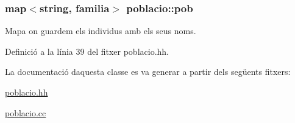 \subsubsection[{\texorpdfstring{pob}{pob}}]{\setlength{\rightskip}{0pt plus 5cm}map$<$string, {\bf familia}$>$ poblacio\+::pob\hspace{0.3cm}{\ttfamily [private]}}\hypertarget{classpoblacio_a7ecb70033b151a937143b07d489c4c17}{}\label{classpoblacio_a7ecb70033b151a937143b07d489c4c17}


Mapa on guardem els individus amb els seus noms. 



Definició a la línia 39 del fitxer poblacio.\+hh.



La documentació d\textquotesingle{}aquesta classe es va generar a partir dels següents fitxers\+:\begin{DoxyCompactItemize}
\item 
\hyperlink{poblacio_8hh}{poblacio.\+hh}\item 
\hyperlink{poblacio_8cc}{poblacio.\+cc}\end{DoxyCompactItemize}
